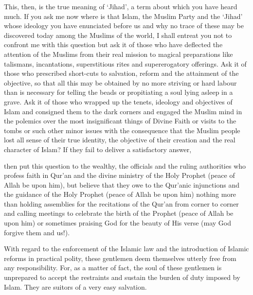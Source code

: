 This, then, is the true meaning of `Jihad', a term about which you have
heard much. If you ask me now where is that Islam, the Muslim Party and
the `Jihad' whose ideology you have enunciated before us and why no
trace of these may be discovered today among the Muslims of the world, I
shall entreat you not to confront me with this question but ask it of
those who have deflected the attention of the Muslims from their real
mission to magical preparations like talismans, incantations,
superstitious rites and supererogatory offerings. Ask it of those who
prescribed short-cuts to salvation, reform and the attainment of the
objective, so that all this may be obtained by no more striving or hard
labour than is necessary for telling the beads or propitiating a soul
lying asleep in a grave. Ask it of those who wrapped up the tenets,
ideology and objectives of Islam and consigned them to the dark corners
and engaged the Muslim mind in the polemics over the most insignificant
things of Divine Faith or visits to the tombs or such other minor issues
with the consequence that the Muslim people lost all sense of their true
identity, the objective of their creation and the real character of
Islam? If they fail to deliver a satisfactory answer,

then put this question to the wealthy, the officials and the ruling
authorities who profess faith in Qur'an and the divine ministry of the
Holy Prophet (peace of Allah be upon him), but believe that they owe to
the Qur'anic injunctions and the guidance of the Holy Prophet (peace of
Allah be upon him) nothing more than holding assemblies for the
recitations of the Qur'an from corner to corner and calling meetings to
celebrate the birth of the Prophet (peace of Allah be upon him) or
sometimes praising God for the beauty of His verse (may God forgive them
and us!).

With regard to the enforcement of the Islamic law and the introduction
of Islamic reforms in practical polity, these gentlemen deem themselves
utterly free from any responsibility. For, as a matter of fact, the soul
of these gentlemen is unprepared to accept the restraints and sustain
the burden of duty imposed by Islam. They are suitors of a very easy
salvation.
